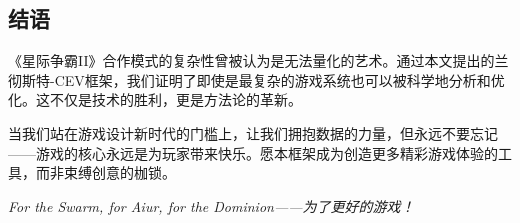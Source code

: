 \documentclass[a4paper,12pt]{article}
\begin{document}
\subsection{结语}

《星际争霸II》合作模式的复杂性曾被认为是无法量化的艺术。通过本文提出的兰彻斯特-CEV框架，我们证明了即使是最复杂的游戏系统也可以被科学地分析和优化。这不仅是技术的胜利，更是方法论的革新。

当我们站在游戏设计新时代的门槛上，让我们拥抱数据的力量，但永远不要忘记——游戏的核心永远是为玩家带来快乐。愿本框架成为创造更多精彩游戏体验的工具，而非束缚创意的枷锁。

\begin{center}
\textit{For the Swarm, for Aiur, for the Dominion——为了更好的游戏！}
\end{center}
\end{document}

